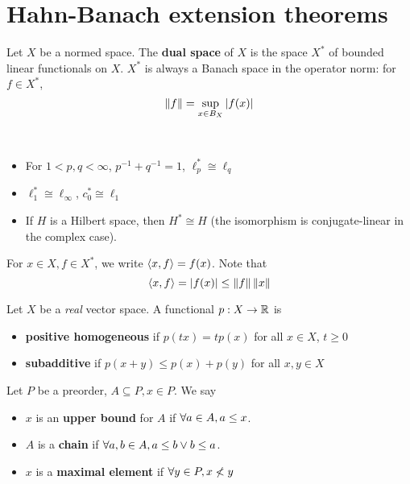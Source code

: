 \documentclass{article}
\begin{document}
\clearpage

\section{Hahn-Banach extension theorems}

\newlec

Let $X$ be a normed space. The {\bf dual space} of $X$ is the space $X^*$ of
bounded linear functionals on $X$.
$X^*$ is always a Banach space in the operator norm: for $f \in X^*$,
$$\left\lVert f\right\rVert = \sup_{x \in B_X} |f(x)|$$

\begin{egs*}~
  \begin{itemize}
    \item For $1 < p, q < \infty$, $p^{-1} + q^{-1} = 1$, $\ell_p^* \cong \ell_q$
    \item $\ell_1^* \cong \ell_\infty$, $c_0^* \cong \ell_1$
    \item If $H$ is a Hilbert space, then $H^* \cong H$ (the isomorphism is conjugate-linear in the complex case).
  \end{itemize}
\end{egs*}

For $x \in X, f \in X^*$, we write $\left\langle x, f\right\rangle = f(x)$. Note that
$$\left\langle x, f\right\rangle = |f(x)| \le \left\lVert f\right\rVert\left\lVert x\right\rVert$$

\begin{dfn*}
  Let $X$ be a {\it real} vector space. A functional $p : X \to \mathbb R$ is
  \begin{itemize}
    \item {\bf positive homogeneous} if $p(tx) = tp(x)$ for all $x \in X$, $t \ge 0$
    \item {\bf subadditive} if $p(x + y) \le p(x) + p(y)$ for all $x, y \in X$
  \end{itemize}
\end{dfn*}

\begin{dfn*}
  Let $P$ be a preorder, $A \subseteq P, x \in P$. We say
  \begin{itemize}
    \item $x$ is an {\bf upper bound} for $A$ if $\forall a \in A, a \le x$.
    \item $A$ is a {\bf chain} if $\forall a, b \in A, a \le b \lor b \le a$.
    \item $x$ is a {\bf maximal element} if $\forall y \in P, x \not < y$
  \end{itemize}
\end{dfn*}
\end{document}
